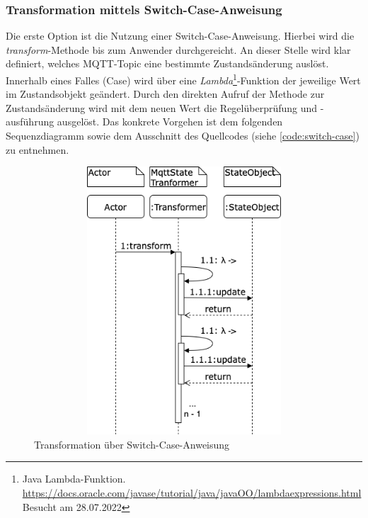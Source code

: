     \subsubsection*{Transformation mittels Switch-Case-Anweisung}
    Die erste Option ist die Nutzung einer Switch-Case-Anweisung. Hierbei wird die \textit{transform}-Methode bis zum Anwender durchgereicht. An dieser Stelle 
    wird klar definiert, welches \acs{MQTT}-Topic eine bestimmte Zustandsänderung auslöst. Innerhalb eines Falles (Case) wird über eine 
    \textit{Lambda}\footnote{Java Lambda-Funktion. \url{https://docs.oracle.com/javase/tutorial/java/javaOO/lambdaexpressions.html} Besucht am 28.07.2022}-Funktion 
    der jeweilige Wert im Zustandsobjekt geändert. Durch den direkten Aufruf der Methode zur Zustandsänderung wird mit dem neuen Wert die Regelüberprüfung und -ausführung 
    ausgelöst. Das konkrete Vorgehen ist dem folgenden Sequenzdiagramm sowie dem Ausschnitt des Quellcodes (siehe \ref{code:switch-case}) zu entnehmen.
    \pagebreak
    \begin{figure}[hbt!]
        \centering
        \includegraphics[width=14cm,height=10cm,keepaspectratio]{images/Transformation_old.png}
        \caption{Transformation über Switch-Case-Anweisung}
        \label{fig:sequenceTransformationOld}
    \end{figure}

